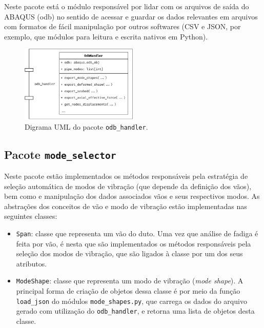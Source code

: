 Neste pacote está o módulo responsável por lidar com os arquivos de saída do ABAQUS (odb) no sentido de acessar e guardar os dados relevantes em arquivos com formatos de fácil manipulação por outros softwares (CSV e JSON, por exemplo, que módulos para leitura e escrita nativos em Python).


\begin{figure}[!ht]
    \centering
    \caption{Digrama UML do pacote \texttt{odb\_handler}.}\label{fig:odb-handler-uml}
    \includegraphics[width=0.5\textwidth]{imagens/odb-handler-uml}
\end{figure}


\subsection{Pacote \texttt{mode\_selector}}


Neste pacote estão implementados os métodos responsáveis pela estratégia de seleção automática de modos de vibração (que depende da definição dos vãos), bem como e manipulação dos dados associados vãos e seus respectivos modos. As abstrações dos conceitos de vão e modo de vibração estão implementadas nas seguintes classes:

\begin{itemize}
    \item \texttt{Span}: classe que representa um vão do duto. Uma vez que análise de fadiga é feita por vão, é nesta que são implementados os métodos responsáveis pela seleção dos modos de vibração, que são ligados à classe por um dos seus atributos.

    \item \texttt{ModeShape}: classe que representa um modo de vibração (\textit{mode shape}). A principal forma de criação de objetos dessa classe é por meio da função \texttt{load\_json} do módulos \texttt{mode\_shapes.py}, que carrega os dados do arquivo gerado com utilização do \texttt{odb\_handler}, e retorna uma lista de objetos desta classe.
\end{itemize}

